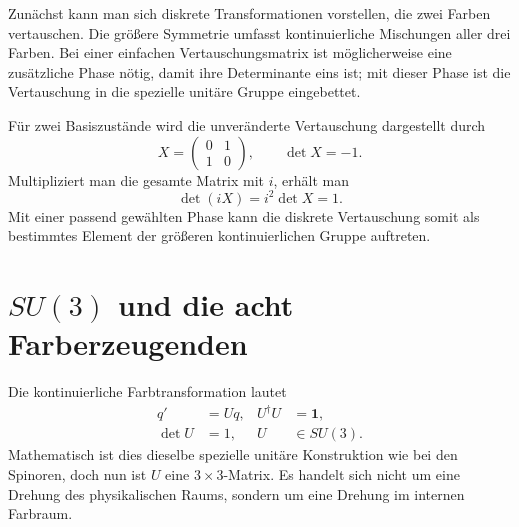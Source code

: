 Zunächst kann man sich diskrete Transformationen vorstellen, die zwei Farben vertauschen. Die größere Symmetrie umfasst kontinuierliche Mischungen aller drei Farben. Bei einer einfachen Vertauschungsmatrix ist möglicherweise eine zusätzliche Phase nötig, damit ihre Determinante eins ist; mit dieser Phase ist die Vertauschung in die spezielle unitäre Gruppe eingebettet.

Für zwei Basiszustände wird die unveränderte Vertauschung dargestellt durch
\begin{equation}
X=
\begin{pmatrix}0&1\\1&0\end{pmatrix},
\qquad
\det X=-1.
\end{equation}
Multipliziert man die gesamte Matrix mit \(i\), erhält man
\begin{equation}
\det(iX)=i^2\det X=1.
\end{equation}
Mit einer passend gewählten Phase kann die diskrete Vertauschung somit als bestimmtes Element der größeren kontinuierlichen Gruppe auftreten.

\begin{classroomqa}\end{classroomqa}

\section{\texorpdfstring{\(SU(3)\)}{SU(3)} und die acht Farberzeugenden}

Die kontinuierliche Farbtransformation lautet
\begin{equation}
\begin{aligned}
q'&=Uq,
&
U^\dagger U&=\boldsymbol 1,
\\
\det U&=1,
&
U&\in SU(3).
\end{aligned}
\label{eq:l3-su3-action}
\end{equation}
Mathematisch ist dies dieselbe spezielle unitäre Konstruktion wie bei den Spinoren, doch nun ist \(U\) eine \(3\times3\)-Matrix. Es handelt sich nicht um eine Drehung des physikalischen Raums, sondern um eine Drehung im internen Farbraum.

